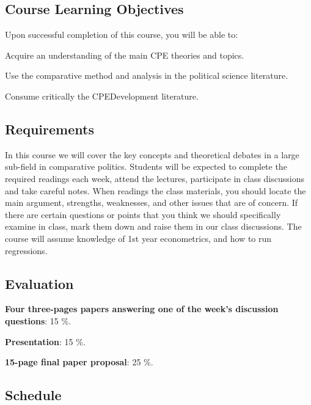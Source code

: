 \documentclass[letterpaper]{article}
\renewenvironment{itemize}{
  \begin{list}{}{
    \setlength{\leftmargin}{1.5em}
  }
}{
  \end{list}
}
\begin{document}
\subsection*{Course Learning Objectives}
 
Upon successful completion of this course, you will be able to:

\begin{itemize}
	\item[$\bullet$] Acquire an understanding of the main CPE theories and topics.
	\item[$\bullet$] Use the comparative method and analysis in the political science literature.
	\item[$\bullet$] Consume critically the CPE\/Development literature.
\end{itemize}



\subsection*{Requirements}

In this course we will cover the key concepts and theoretical debates in a large sub-field in comparative politics. Students will be expected to complete the required readings each week, attend the lectures, participate in class discussions and take careful notes. When readings the class materials, you should locate the main argument, strengths, weaknesses, and other issues that are of concern. If there are certain questions or points that you think we should specifically examine in class, mark them down and raise them in our class discussions. The course will assume knowledge of 1st year econometrics, and how to run regressions.

\subsection*{Evaluation}


\begin{itemize}
	\item[$\bullet$] {\bf Four three-pages papers answering one of the week's discussion questions}: 15 \%.
	\item[$\bullet$] {\bf Presentation}: 15 \%.
	\item[$\bullet$] {\bf 15-page final paper proposal}: 25 \%.
\end{itemize}


\subsection*{Schedule}
\end{document}

